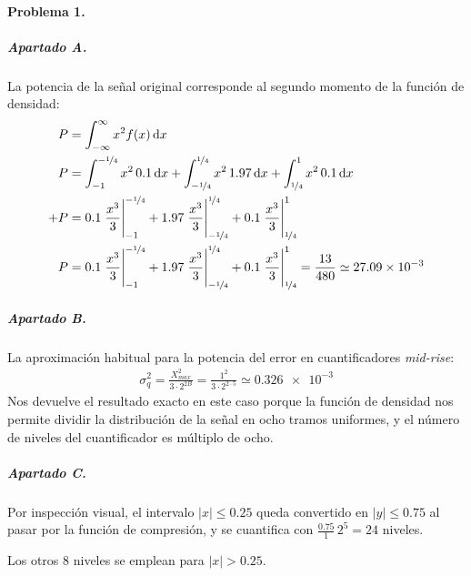


\startpage

\paragraph{Problema 1.}

\subparagraph{Apartado A.}

La potencia de la señal original corresponde al segundo momento de la
función de densidad:
%
\begin{align*}
  P &= \int^{\infty}_{-\infty} x^2 f(x) \dif x
\\
  P &=
    \int^{-\nicefrac{1}{4}}_{-1} x^2 \, \num{0.1} \dif x +
    \int^{\nicefrac{1}{4}}_{-\nicefrac{1}{4}} x^2 \, \num{1.97} \dif x +
    \int^{1}_{\nicefrac{1}{4}} x^2 \, \num{0.1} \dif x
\\+
  P &=
    \num{0.1} \left. \frac{x^3}{3} \right|^{-\nicefrac{1}{4}}_{-1} +
    \num{1.97} \left. \frac{x^3}{3} \right|^{\nicefrac{1}{4}}_{-\nicefrac{1}{4}} +
    \num{0.1} \left. \frac{x^3}{3} \right|^{1}_{\nicefrac{1}{4}}
\\
  P &=
    \num{0.1} \left. \frac{x^3}{3} \right|^{-\nicefrac{1}{4}}_{-1} +
    \num{1.97} \left. \frac{x^3}{3} \right|^{\nicefrac{1}{4}}_{-\nicefrac{1}{4}} +
    \num{0.1} \left. \frac{x^3}{3} \right|^{1}_{\nicefrac{1}{4}}
    = \frac{13}{480} \simeq \num{27.09e-3}
\end{align*}

\subparagraph{Apartado B.}

La aproximación habitual para la potencia del error en cuantificadores \emph{mid-rise}:
%
\begin{align*}
  \sigma_q^2 = \frac{X_{max}^2}{3 \cdot 2^{2B}}
           = \frac{1^2}{3 \cdot 2^{2 \cdot 5}}
           \simeq \num{0.326e-3}
\end{align*}
%
Nos devuelve el resultado exacto en este caso porque la función de densidad nos
permite dividir la distribución de la señal en ocho tramos uniformes, y el
número de niveles del cuantificador es múltiplo de ocho.

\subparagraph{Apartado C.}

Por inspección visual, el intervalo $\left|x\right| \leq \num{0.25}$ queda
convertido en $\left|y\right| \leq \num{0.75}$ al pasar por la función de
compresión, y se cuantifica con $\frac{\num{0.75}}{1} \, 2^5 = 24$ niveles.

Los otros 8 niveles se emplean para $\left|x\right| > \num{0.25}$.

